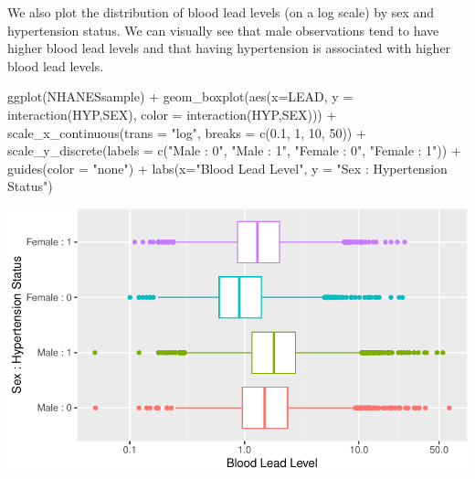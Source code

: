 \documentclass[
  letterpaper,
]{latex/krantz}
\makeatletter
\newenvironment{Shaded}{\begin{snugshade}}{\end{snugshade}}
\newcommand{\AttributeTok}[1]{\textcolor[rgb]{0.40,0.45,0.13}{#1}}
\newcommand{\DecValTok}[1]{\textcolor[rgb]{0.68,0.00,0.00}{#1}}
\newcommand{\FloatTok}[1]{\textcolor[rgb]{0.68,0.00,0.00}{#1}}
\newcommand{\FunctionTok}[1]{\textcolor[rgb]{0.28,0.35,0.67}{#1}}
\newcommand{\NormalTok}[1]{\textcolor[rgb]{0.00,0.23,0.31}{#1}}
\newcommand{\SpecialCharTok}[1]{\textcolor[rgb]{0.37,0.37,0.37}{#1}}
\newcommand{\StringTok}[1]{\textcolor[rgb]{0.13,0.47,0.30}{#1}}
\newenvironment{kframe}{%
\medskip{}
\setlength{\fboxsep}{.8em}
 \def\at@end@of@kframe{}%
 \ifinner\ifhmode%
  \def\at@end@of@kframe{\end{minipage}}%
  \begin{minipage}{\columnwidth}%
 \fi\fi%
 \def\FrameCommand##1{\hskip\@totalleftmargin \hskip-\fboxsep
 \colorbox{shadecolor}{##1}\hskip-\fboxsep
     \hskip-\linewidth \hskip-\@totalleftmargin \hskip\columnwidth}%
 \MakeFramed {\advance\hsize-\width
   \@totalleftmargin\z@ \linewidth\hsize
   \@setminipage}}%
 {\par\unskip\endMakeFramed%
 \at@end@of@kframe}
\renewenvironment{Shaded}{\begin{kframe}}{\end{kframe}}
\makeatother
\begin{document}
We also plot the distribution of blood lead levels (on a log scale) by
sex and hypertension status. We can visually see that male observations
tend to have higher blood lead levels and that having hypertension is
associated with higher blood lead levels.

\begin{Shaded}
\begin{Highlighting}[]
\FunctionTok{ggplot}\NormalTok{(NHANESsample) }\SpecialCharTok{+}
  \FunctionTok{geom\_boxplot}\NormalTok{(}\FunctionTok{aes}\NormalTok{(}\AttributeTok{x=}\NormalTok{LEAD,}
                   \AttributeTok{y =} \FunctionTok{interaction}\NormalTok{(HYP,SEX),}
                   \AttributeTok{color =} \FunctionTok{interaction}\NormalTok{(HYP,SEX))) }\SpecialCharTok{+}
  \FunctionTok{scale\_x\_continuous}\NormalTok{(}\AttributeTok{trans =} \StringTok{"log"}\NormalTok{, }\AttributeTok{breaks =} \FunctionTok{c}\NormalTok{(}\FloatTok{0.1}\NormalTok{, }\DecValTok{1}\NormalTok{, }\DecValTok{10}\NormalTok{, }\DecValTok{50}\NormalTok{)) }\SpecialCharTok{+}
  \FunctionTok{scale\_y\_discrete}\NormalTok{(}\AttributeTok{labels =} \FunctionTok{c}\NormalTok{(}\StringTok{"Male : 0"}\NormalTok{, }\StringTok{"Male : 1"}\NormalTok{,}
                              \StringTok{"Female : 0"}\NormalTok{, }\StringTok{"Female : 1"}\NormalTok{)) }\SpecialCharTok{+}
  \FunctionTok{guides}\NormalTok{(}\AttributeTok{color =} \StringTok{"none"}\NormalTok{) }\SpecialCharTok{+}
  \FunctionTok{labs}\NormalTok{(}\AttributeTok{x=}\StringTok{"Blood Lead Level"}\NormalTok{,}
       \AttributeTok{y =} \StringTok{"Sex : Hypertension Status"}\NormalTok{)}
\end{Highlighting}
\end{Shaded}

\begin{center}
\includegraphics[width=1\textwidth,height=\textheight]{book/cs_testing_files/figure-pdf/unnamed-chunk-4-1.pdf}
\end{center}
\end{document}
